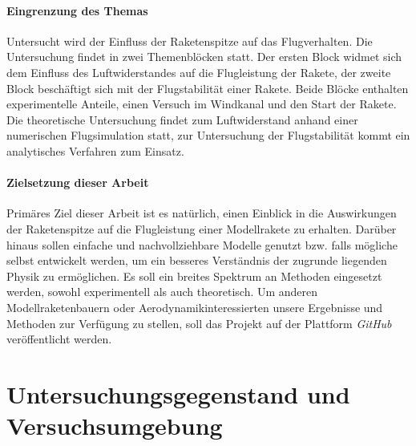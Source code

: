 \documentclass[10pt,a4paper]{article}
\begin{document}
\paragraph{Eingrenzung des Themas}
Untersucht wird der Einfluss der Raketenspitze auf das Flugverhalten. Die Untersuchung findet in zwei Themenblöcken statt. Der ersten Block widmet sich dem Einfluss des Luftwiderstandes auf die Flugleistung der Rakete, der zweite Block beschäftigt sich mit der Flugstabilität einer Rakete. Beide Blöcke enthalten experimentelle Anteile, einen Versuch im Windkanal und den Start der Rakete. Die theoretische Untersuchung findet zum Luftwiderstand anhand einer numerischen Flugsimulation statt, zur Untersuchung der Flugstabilität kommt ein analytisches Verfahren zum Einsatz.

\paragraph{Zielsetzung dieser Arbeit}
Primäres Ziel dieser Arbeit ist es natürlich, einen Einblick in die Auswirkungen der Raketenspitze auf die Flugleistung einer Modellrakete zu erhalten. Darüber hinaus sollen einfache und nachvollziehbare Modelle genutzt bzw. falls mögliche selbst entwickelt werden, um ein besseres Verständnis der zugrunde liegenden Physik zu ermöglichen. Es soll ein breites Spektrum an Methoden eingesetzt werden, sowohl experimentell als auch theoretisch. Um anderen Modellraketenbauern oder Aerodynamikinteressierten unsere Ergebnisse und Methoden zur Verfügung zu stellen, soll das Projekt auf der Plattform  \emph{GitHub} veröffentlicht werden.



\section{Untersuchungsgegenstand und Versuchsumgebung}
\end{document}
